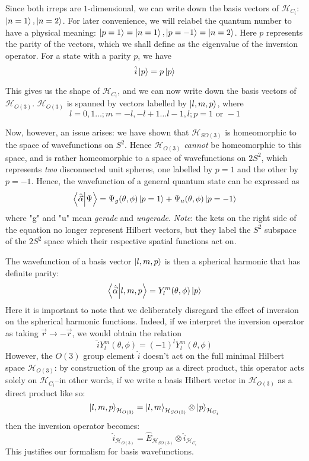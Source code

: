 \documentclass[12pt]{article}
\begin{document}
	Since both irreps are $1$-dimensional, we can write down the basis vectors of $\mathcal{H}_{C_i}$: $\ket{n=1}, \ket{n=2}$. For later convenience, we will relabel the quantum number to have a physical meaning: $\ket{p=1}=\ket{n=1}, \ket{p=-1}=\ket{n=2}$. Here $p$ represents the parity of the vectors, which we shall define as the eigenvalue of the inversion operator. For a state with a parity $p$, we have 
	$$\hat{i}\ket{p}=p\ket{p}$$
	
	This gives us the shape of $\mathcal{H}_{C_i}$, and we can now write down the basis vectors of $\mathcal{H}_{O(3)}$. $\mathcal{H}_{O(3)}$ is spanned by vectors labelled by $\ket{l,m,p}$, where
	$$l=0, 1\dots; m=-l,-l+1\dots l-1,l; p=1\text{ or }-1$$
	
	Now, however, an issue arises: we have shown that $\mathcal{H}_{SO(3)}$ is homeomorphic to the space of wavefunctions on $S^2$. Hence $\mathcal{H}_{O(3)}$ \textit{cannot} be homeomorphic to this space, and is rather homeomorphic to a space of wavefunctions on $2S^2$, which represents \textit{two} disconnected unit spheres, one labelled by $p=1$ and the other by $p=-1$. Hence, the wavefunction of a general quantum state can be expressed as
	$$\braket{\hat{\vec{\alpha}}}{\Psi}=\Psi_g(\theta,\phi)\ket{p=1}+\Psi_u(\theta,\phi)\ket{p=-1}$$
	where "g" and "u" mean \textit{gerade} and \textit{ungerade}. \textit{Note}: the kets on the right side of the equation no longer represent Hilbert vectors, but they label the $S^2$ subspace of the $2S^2$ space which their respective spatial functions act on.
	
	The wavefunction of a basis vector $\ket{l,m,p}$ is then a spherical harmonic that has definite parity:
	$$\braket{\hat{\vec{\alpha}}}{l,m,p}=Y_l^m(\theta,\phi)\ket{p}$$
	Here it is important to note that we deliberately disregard the effect of inversion on the spherical harmonic functions. Indeed, if we interpret the inversion operator as taking $\vec{r}\to-\vec{r}$, we would obtain the relation
	$$\hat{i}Y_l^m(\theta,\phi)=(-1)^lY_l^m(\theta,\phi)$$
	However, the $O(3)$ group element $\hat{i}$ doesn't act on the full minimal Hilbert space $\mathcal{H}_{O(3)}$: by construction of the group as a direct product, this operator acts solely on $\mathcal{H}_{C_i}$--in other words, if we write a basis Hilbert vector in $\mathcal{H}_{O(3)}$ as a direct product like so:
	$$\ket{l,m,p}_{\mathcal{H}_{O(3)}}=\ket{l,m}_{\mathcal{H}_{SO(3)}}\otimes \ket{p}_{\mathcal{H}_{C_i}}$$
	then the inversion operator becomes:
	$$\hat{i}_{\mathcal{H}_{O(3)}}=\hat{E}_{\mathcal{H}_{SO(3)}}\otimes \hat{i}_{\mathcal{H}_{C_i}}$$
	This justifies our formalism for basis wavefunctions.
	
\end{document}
